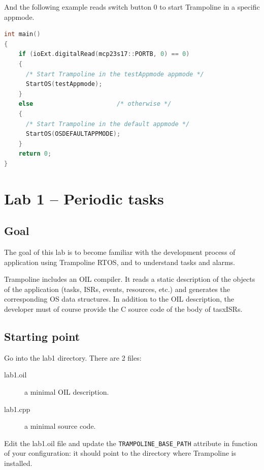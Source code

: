 \documentclass[11pt]{report}
\begin{document}
And the following example reads switch button {0} to start Trampoline in a specific appmode.

\begin{lstlisting}[language=C]
int main()
{
    if (ioExt.digitalRead(mcp23s17::PORTB, 0) == 0)
    {
      /* Start Trampoline in the testAppmode appmode */
      StartOS(testAppmode);
    }
    else                       /* otherwise */
    {
      /* Start Trampoline in the default appmode */
      StartOS(OSDEFAULTAPPMODE);
    }
    return 0;
}
\end{lstlisting}


\chapter{Lab 1 -- Periodic tasks}

\section{Goal}

The goal of this lab is to become familiar with the development
process of application using Trampoline RTOS, and to understand tasks and alarms.

Trampoline includes an OIL compiler.
It reads a static description of the objects of the application (tasks,
ISRs, events, resources, etc.) and generates the corresponding OS data structures.
In addition to the OIL description, the developer must of course provide the C
source code of the body of tasxISRs.


\section{Starting point}

Go into the lab1 directory. There are 2 files:

\begin{description}
    \item[lab1.oil] a minimal OIL description.
    \item[lab1.cpp] a minimal source code.
\end{description}

Edit the lab1.oil file and update the \texttt{TRAMPOLINE\_BASE\_PATH} attribute
in function of your configuration: it should point to the directory where Trampoline is installed.

\end{document}
